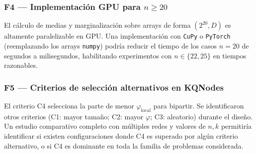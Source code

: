 \subsubsection*{F4 — Implementación GPU para $n \geq 20$}

El cálculo de medias y marginalización sobre arrays de forma
$(2^{20}, D)$ es altamente paralelizable en GPU.
Una implementación con \texttt{CuPy} o \texttt{PyTorch} (reemplazando
los arrays \texttt{numpy}) podría reducir el tiempo de los casos
$n=20$ de segundos a milisegundos, habilitando experimentos con
$n \in \{22, 25\}$ en tiempos razonables.

\subsubsection*{F5 — Criterios de selección alternativos en KQNodes}

El criterio C4 selecciona la parte de menor $\varphi_{\text{local}}$
para bipartir.
Se identificaron otros criterios (C1: mayor tamaño; C2: mayor $\varphi$;
C3: aleatorio) durante el diseño.
Un estudio comparativo completo con múltiples redes y valores de $n, k$
permitiría identificar si existen configuraciones donde C4 es superado
por algún criterio alternativo, o si C4 es dominante en toda la familia
de problemas considerada.
